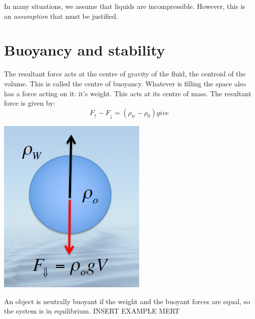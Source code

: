 \documentclass[class=report, crop=false, 12pt,a4paper]{standalone}
\begin{document}
In many situations, we assume  that liquids are incompressible. However, this is an \emph{assumption} that must be justified. 

\section{Buoyancy and stability}
The resultant force acts at the centre of gravity of the fluid, the centroid of the volume. This is called the centre of buoyancy. Whatever is filling the space also has a force acting on it: it's weight. This acts at its centre of mass. The resultant force is given by: 
\begin{equation}
  F_\uparrow - F_\downarrow = (\rho_w - \rho_0) give
\end{equation}
\begin{center}
  \includegraphics[width = 0.4 \textwidth]{../img/BuoyancyForces}
\end{center}
An object is neutrally buoyant if the weight and the buoyant forces are equal, so the system is in equilibrium. INSERT EXAMPLE MERT
\end{document}
